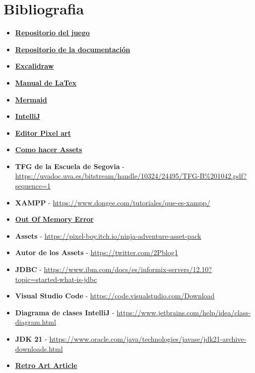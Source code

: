 \documentclass[a4paper]{article}
\begin{document}
\section{Bibliografia}
\begin{itemize}
    \item \textbf{\href{https://github.com/Pisa-17/TFG-DAM-Eldoria/tree/main}{Repositorio del juego}}
    \item \textbf{\href{https://github.com/Pisa-17/documentationEldoriaTFG/tree/main}{Repositorio de la documentación}}
    \item \textbf{\href{https://excalidraw.com/}{Excalidraw}}
    \item \textbf{\href{https://manualdelatex.com/}{Manual de LaTex}}
    \item \textbf{\href{https://mermaid.js.org/intro/getting-started.html}{Mermaid}}
    \item \textbf{\href{https://www.jetbrains.com/es-es/idea/}{IntelliJ}} 
    \item \textbf{\href{https://www.piskelapp.com/}{Editor Pixel art}}
    \item \textbf{\href{https://tips.clip-studio.com/es-es/articles/2484}{Como hacer Assets}}
    \item \textbf{TFG de la Escuela de Segovia} - \url{https://uvadoc.uva.es/bitstream/handle/10324/24495/TFG-B%201042.pdf?sequence=1}
    \item \textbf{XAMPP} - \url{https://www.dongee.com/tutoriales/que-es-xampp/}
    \item \textbf{\href{https://stackoverflow.com/questions/1596009/java-lang-outofmemoryerror-java-heap-space}{Out Of Memory Error}}
    \item \textbf{Assets} - \url{https://pixel-boy.itch.io/ninja-adventure-asset-pack}
    \item \textbf{Autor de los Assets} - \url{https://twitter.com/2Pblog1}
    \item \textbf{JDBC} - \url{https://www.ibm.com/docs/es/informix-servers/12.10?topic=started-what-is-jdbc}
    \item \textbf{Visual Studio Code} - \url{https://code.visualstudio.com/Download}
    \item \textbf{Diagrama de clases IntelliJ} - \url{https://www.jetbrains.com/help/idea/class-diagram.html}
    \item \textbf{JDK 21} - \url{https://www.oracle.com/java/technologies/javase/jdk21-archive-downloads.html}
    \item \textbf{\href{https://medium.com/@dq_irfandi/the-nostalgia-effect-how-retro-games-influence-modern-gaming-8925be77694e}{Retro Art Article}}

\end{itemize}
\end{document}

